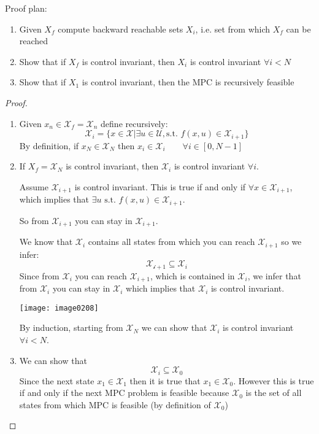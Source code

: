 Proof plan:
\begin{enumerate}
\item Given $X_f$ compute backward reachable sets $X_i$, i.e. set from which $X_f$ can be reached
\item Show that if $X_f$ is control invariant, then $X_i$ is control invariant $\forall i < N$
\item Show that if $X_1$ is control invariant, then the MPC is recursively feasible
\end{enumerate}
\begin{proof}
\begin{enumerate}
\item Given $x_n \in \mathcal{X}_f = \mathcal{X}_n$ define  recursively:
\[\mathcal{X}_i = \{x\in\mathcal{X}|\exists u\in\mathcal{U}, \text{s.t. } f(x,u)\in\mathcal{X}_{i+1}\}\]
By definition, if $x_N  \in \mathcal{X}_N$ then $x_i\in\mathcal{X}_i\qquad\forall i \in[0,N-1]$
\item If $X_f = \mathcal{X}_N$ is control invariant, then $\mathcal{X}_i$ is control invariant $\forall i$.

Assume $\mathcal{X}_{i+1}$ is control invariant. This is true if and only if $\forall x \in \mathcal{X}_{i+1}$, which implies that $\exists u \text{ s.t. } f(x,u)\in \mathcal{X}_{i+1}$.

\begin{minipage}{.625\textwidth}
So from $\mathcal{X}_{i+1}$ you can stay in $\mathcal{X}_{i+1}$.

We know that $\mathcal{X}_i$ contains all states from which you can reach $\mathcal{X}_{i+1}$ so we infer:
\[\mathcal{X_{i+1}}\subseteq \mathcal{X}_i\]
Since from $\mathcal{X}_i$ you can reach $\mathcal{X}_{i+1}$, which is contained in $\mathcal{X}_i$, we infer that from $\mathcal{X}_i$ you can stay in $\mathcal{X}_i$ which implies that $\mathcal{X}_i$ is control  invariant.
\end{minipage}
\hfill
\begin{minipage}{.35\textwidth}
\centering
\texttt{[image: image0208]}
\end{minipage}

By induction, starting from $\mathcal{X}_N$ we can show that $\mathcal{X}_i$ is control invariant $\forall i <N$.
\item We can show that 
\[\mathcal{X}_i \subseteq \mathcal{X}_0\]
Since the next state $x_1\in\mathcal{X}_1$  then it is true that $x_1\in\mathcal{X}_0$. However this is true if and only if the next MPC problem is feasible because $\mathcal{X}_0$ is the set of all states from which MPC is feasible (by definition of $\mathcal{X}_0$)
\end{enumerate}
\end{proof}
 
